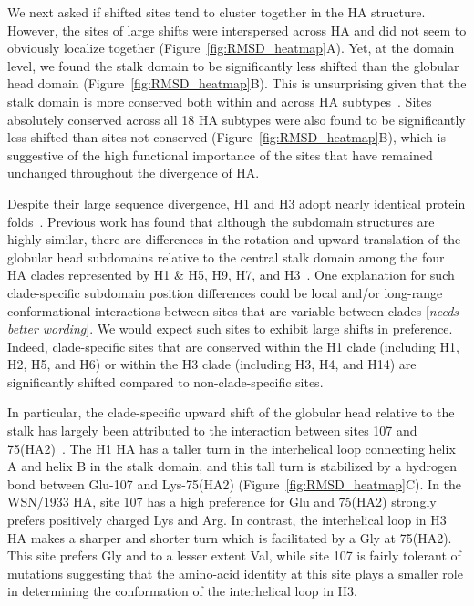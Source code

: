 \documentclass[9pt,twocolumn,twoside]{pnas-new}
\newcommand{\comment}[1]{{\color{red}[\textsl{#1}]}}
\begin{document}
We next asked if shifted sites tend to cluster together in the HA structure.
However, the sites of large shifts were interspersed across HA and did not seem to obviously localize together (Figure~\ref{fig:RMSD_heatmap}A).
Yet, at the domain level, we found the stalk domain to be significantly less shifted than the globular head domain (Figure~\ref{fig:RMSD_heatmap}B). 
This is unsurprising given that the stalk domain is more conserved both within and across HA subtypes~\cite{nobusawa1991comparison,hai2012influenza,mallajosyula2014influenza}.
Sites absolutely conserved across all 18 HA subtypes were also found to be significantly less shifted than sites not conserved (Figure~\ref{fig:RMSD_heatmap}B), which is suggestive of the high functional importance of the sites that have remained unchanged throughout the divergence of HA.

Despite their large sequence divergence, H1 and H3 adopt nearly identical protein folds~\cite{ha2002h5,russell2004h1}.
Previous work has found that although the subdomain structures are highly similar, there are differences in the rotation and upward translation of the globular head subdomains relative to the central stalk domain among the four HA clades represented by H1 \& H5, H9, H7, and H3~\cite{ha2002h5,russell2004h1}.
One explanation for such clade-specific subdomain position differences could be local and/or long-range conformational interactions between sites that are variable between clades \comment{needs better wording}.
We would expect such sites to exhibit large shifts in preference.
Indeed, clade-specific sites that are conserved within the H1 clade (including H1, H2, H5, and H6) or within the H3 clade (including H3, H4, and H14) are significantly shifted compared to non-clade-specific sites.

In particular, the clade-specific upward shift of the globular head relative to the stalk has largely been attributed to the interaction between sites 107 and 75(HA2)~\cite{ha2002h5,russell2004h1}.
The H1 HA has a taller turn in the interhelical loop connecting helix A and helix B in the stalk domain, and this tall turn is stabilized by a hydrogen bond between Glu-107 and Lys-75(HA2) (Figure~\ref{fig:RMSD_heatmap}C).
In the WSN/1933 HA, site 107 has a high preference for Glu and 75(HA2) strongly prefers positively charged Lys and Arg.
In contrast, the interhelical loop in H3 HA makes a sharper and shorter turn which is facilitated by a Gly at 75(HA2).
This site prefers Gly and to a lesser extent Val, while site 107 is fairly tolerant of mutations suggesting that the amino-acid identity at this site plays a smaller role in determining the conformation of the interhelical loop in H3.
\end{document}
